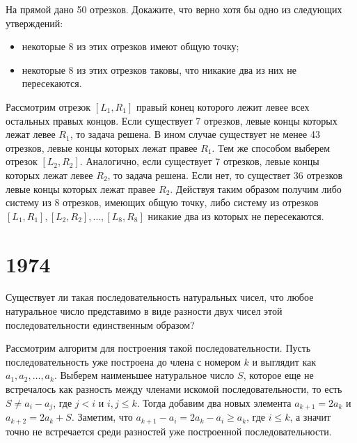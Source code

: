 \documentclass[11pt, a4paper]{template}
\begin{document}
\begin{exercise}[M154]
На прямой дано 50 отрезков. Докажите, что верно хотя бы одно из следующих
утверждений:
\begin{itemize}
\item некоторые 8 из этих отрезков имеют общую точку;
\item некоторые 8 из этих отрезков таковы, что никакие два из них не пересекаются.
\end{itemize}
\end{exercise}

\begin{solution}
Рассмотрим отрезок $[L_{1}, R_{1}]$ правый конец которого лежит левее всех остальных правых концов. Если существует 7 отрезков, левые концы которых лежат левее $R_{1}$, то задача решена. В ином случае существует не менее 43 отрезков, левые концы которых лежат правее $R_{1}$. Тем же способом выберем отрезок $[L_{2}, R_{2}]$. Аналогично, если существует 7 отрезков, левые концы которых лежат левее $R_{2}$, то задача решена. Если нет, то существет 36 отрезков левые концы которых лежат правее $R_{2}$. Действуя таким образом получим либо систему из 8 отрезков, имеющих общую точку, либо систему из отрезков $[L_{1}, R_{1}], [L_{2}, R_{2}], \dots, [L_{8}, R_{8}]$ никакие два из которых не пересекаются. 
\end{solution}

\chapter{1974}

\begin{exercise}[M287]
Существует ли такая последовательность натуральных чисел, что любое натуральное число представимо в виде разности двух чисел этой последовательности единственным образом?
\end{exercise}

\begin{solution}
Рассмотрим алгоритм для построения такой последовательности. Пусть последовательность уже построена до члена с номером $k$ и выглядит как $a_{1}, a_{2}, \dots, a_{k}$. Выберем наименьшее натуральное число $S$, которое еще не встречалось как разность между членами искомой последовательности, то есть $S \neq a_{i} - a_{j}$, где $j < i$ и $i, j \leqslant k$. Тогда добавим два новых элемента $a_{k+1} = 2a_{k}$ и $a_{k+2} = 2a_{k} + S$. Заметим, что $a_{k+1} - a_{i} = 2a_{k} - a_{i} \geqslant a_{k}$, где $i \leqslant k$, а значит точно не встречается среди разностей уже построенной последовательности. 
\end{solution}
\end{document}
